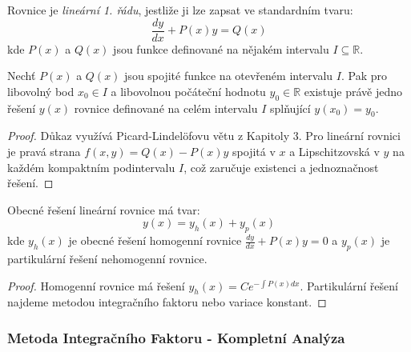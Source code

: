 \begin{definition}
Rovnice je \emph{lineární 1. řádu}, jestliže ji lze zapsat ve standardním tvaru:
\[
\frac{dy}{dx} + P(x)y = Q(x)
\]
kde $P(x)$ a $Q(x)$ jsou funkce definované na nějakém intervalu $I \subseteq \mathbb{R}$.
\end{definition}

\vspace{0.6\baselineskip}

\begin{theorem}
Nechť $P(x)$ a $Q(x)$ jsou spojité funkce na otevřeném intervalu $I$. Pak pro libovolný bod $x_0 \in I$ a libovolnou počáteční hodnotu $y_0 \in \mathbb{R}$ existuje právě jedno řešení $y(x)$ rovnice definované na celém intervalu $I$ splňující $y(x_0) = y_0$.
\end{theorem}

\vspace{0.4\baselineskip}

\begin{proof}
Důkaz využívá Picard-Lindelöfovu větu z Kapitoly 3. Pro lineární rovnici je pravá strana $f(x,y) = Q(x) - P(x)y$ spojitá v $x$ a Lipschitzovská v $y$ na každém kompaktním podintervalu $I$, což zaručuje existenci a jednoznačnost řešení.
\end{proof}

\vspace{0.6\baselineskip}

\begin{theorem}
Obecné řešení lineární rovnice má tvar:
\[
y(x) = y_h(x) + y_p(x)
\]
kde $y_h(x)$ je obecné řešení homogenní rovnice $\frac{dy}{dx} + P(x)y = 0$ a $y_p(x)$ je partikulární řešení nehomogenní rovnice.
\end{theorem}

\vspace{0.4\baselineskip}

\begin{proof}
Homogenní rovnice má řešení $y_h(x) = Ce^{-\int P(x)dx}$. Partikulární řešení najdeme metodou integračního faktoru nebo variace konstant.
\end{proof}

\vspace{0.8\baselineskip}

\subsubsection{Metoda Integračního Faktoru - Kompletní Analýza}
\label{subsubsec:metoda-integracniho-faktoru}

